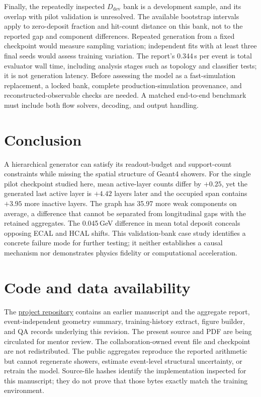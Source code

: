 \documentclass[11pt]{article}
\newcommand{\Ddev}{D_{\mathrm{dev}}}
\begin{document}
Finally, the repeatedly inspected $\Ddev$ bank is a development sample, and its overlap with pilot validation is unresolved. The available bootstrap intervals apply to zero-deposit fraction and hit-count distance on this bank, not to the reported gap and component differences. Repeated generation from a fixed checkpoint would measure sampling variation; independent fits with at least three final seeds would assess training variation. The report's 0.344\,s per event is total evaluator wall time, including analysis stages such as topology and classifier tests; it is not generation latency. Before assessing the model as a fast-simulation replacement, a locked bank, complete production-simulation provenance, and reconstructed-observable checks are needed. A matched end-to-end benchmark must include both flow solvers, decoding, and output handling.

\section{Conclusion}

A hierarchical generator can satisfy its readout-budget and support-count constraints while missing the spatial structure of Geant4 showers. For the single pilot checkpoint studied here, mean active-layer counts differ by $+0.25$, yet the generated last active layer is $+4.42$ layers later and the occupied span contains $+3.95$ more inactive layers. The graph has 35.97 more weak components on average, a difference that cannot be separated from longitudinal gaps with the retained aggregates. The 0.045\,GeV difference in mean total deposit conceals opposing ECAL and HCAL shifts. This validation-bank case study identifies a concrete failure mode for further testing; it neither establishes a causal mechanism nor demonstrates physics fidelity or computational acceleration.

\section*{Code and data availability}

The \href{https://github.com/JulianAttemptsCoding/fast-mc-paper}{project repository} contains an earlier manuscript and the aggregate report, event-independent geometry summary, training-history extract, figure builder, and QA records underlying this revision. The present source and PDF are being circulated for mentor review. The collaboration-owned event file and checkpoint are not redistributed. The public aggregates reproduce the reported arithmetic but cannot regenerate showers, estimate event-level structural uncertainty, or retrain the model. Source-file hashes identify the implementation inspected for this manuscript; they do not prove that those bytes exactly match the training environment.
\end{document}
